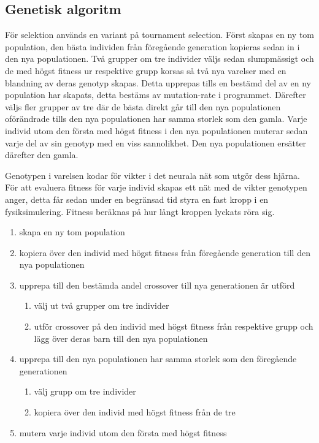 \documentclass[titlepage, twocolumn, a4paper, 12pt]{article}
\begin{document}
\subsection{Genetisk algoritm}
För selektion används en variant på tournament selection. Först skapas en ny tom population, den bästa individen från föregående generation kopieras sedan in i den nya populationen. Två grupper om tre individer väljs sedan slumpmässigt och de med högst fitness ur respektive grupp korsas så två nya varelser med en blandning av deras genotyp skapas. Detta upprepas tills en bestämd del av en ny population har skapats, detta bestäms av mutation-rate i programmet. Därefter väljs fler grupper av tre där de bästa direkt går till den nya populationen oförändrade tills den nya populationen har samma storlek som den gamla. Varje individ utom den första med högst fitness i den nya populationen muterar sedan varje del av sin genotyp med en viss sannolikhet. Den nya populationen ersätter därefter den gamla. 
		
Genotypen i varelsen kodar för vikter i det neurala nät som utgör dess hjärna. För att evaluera fitness för varje individ skapas ett nät med de vikter genotypen anger, detta får sedan under en begränsad tid styra en fast kropp i en fysiksimulering. Fitness beräknas på hur långt kroppen lyckats röra sig.

\begin{enumerate}
\item skapa en ny tom population
\item kopiera över den individ med högst fitness från föregående generation till den nya populationen
\item upprepa till den bestämda andel crossover till nya generationen är utförd
\begin{enumerate}
\item välj ut två grupper om tre individer
\item utför crossover på den individ med högst fitness från respektive grupp och lägg över deras barn till den nya populationen
\end{enumerate}
\item upprepa till den nya populationen har samma storlek som den föregående generationen
\begin{enumerate}
\item välj grupp om tre individer
\item kopiera över den individ med högst fitness från de tre
\end{enumerate}
\item mutera varje individ utom den första med högst fitness
\end{enumerate}
\end{document}
